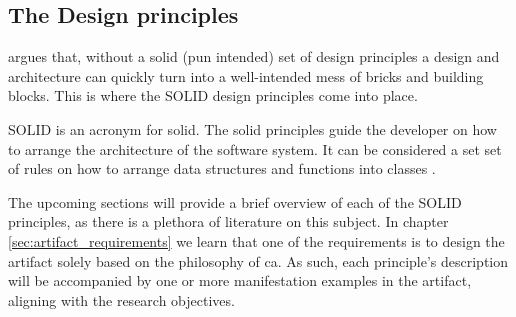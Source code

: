 \subsection{The Design principles} \label{subsec:design_principles}

 argues that, without a solid (pun intended) set of
design principles a design and architecture can quickly turn into a well-intended mess
of bricks and building blocks. This is where the SOLID design principles come into place.

SOLID is an acronym for \gls{solid}. The \gls{solid} principles guide the developer on how
to arrange the architecture of the software system. It can be considered a set set of
rules on how to arrange data structures and functions into classes
\parencite[78]{robert_c_martin_clean_2018}.

The upcoming sections will provide a brief overview of each of the SOLID principles, as
there is a plethora of literature on this subject. In chapter
\ref{sec:artifact_requirements} we learn that one of the requirements is to design the
artifact solely based on the philosophy of \gls{ca}. As such, each principle's description
will be accompanied by one or more manifestation examples in the artifact, aligning with
the research objectives.